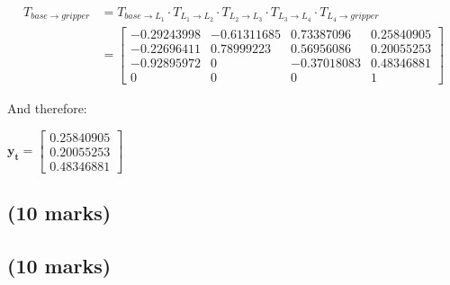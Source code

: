 \begin{align*}
    T_{base \rightarrow gripper} &=
        T_{base \rightarrow L_1} \cdot
        T_{L_1 \rightarrow L_2} \cdot
        T_{L_2 \rightarrow L_3} \cdot
        T_{L_3 \rightarrow L_4} \cdot
        T_{L_4 \rightarrow gripper}\\
        &=
        \begin{bmatrix}
            -0.29243998 & -0.61311685 &  0.73387096 & 0.25840905 \\
            -0.22696411 &  0.78999223 &  0.56956086 & 0.20055253 \\
            -0.92895972 &  0          & -0.37018083 & 0.48346881 \\
             0          &  0          &  0          & 1
        \end{bmatrix}
\end{align*}

And therefore:

\begin{center}
    $ \boldsymbol{y_t} =
        \begin{bmatrix}
            0.25840905 \\
            0.20055253 \\
            0.48346881
        \end{bmatrix} $
\end{center}


\subsection{(10 marks)}


\subsection{(10 marks)}

\newpage
